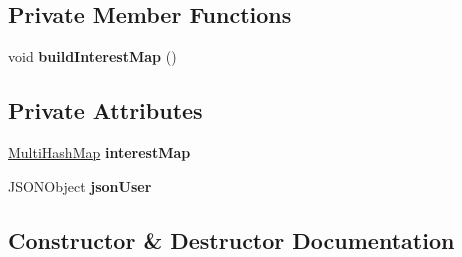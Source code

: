 \subsection*{Private Member Functions}
\begin{DoxyCompactItemize}
\item 
void {\bfseries build\+Interest\+Map} ()\hypertarget{classcom_1_1example_1_1sebastian_1_1tindertp_1_1commonTools_1_1ProfileInfo_a8d562369fc96d3a45db688558a87b998}{}\label{classcom_1_1example_1_1sebastian_1_1tindertp_1_1commonTools_1_1ProfileInfo_a8d562369fc96d3a45db688558a87b998}

\end{DoxyCompactItemize}
\subsection*{Private Attributes}
\begin{DoxyCompactItemize}
\item 
\hyperlink{classcom_1_1example_1_1sebastian_1_1tindertp_1_1commonTools_1_1MultiHashMap}{Multi\+Hash\+Map} {\bfseries interest\+Map}\hypertarget{classcom_1_1example_1_1sebastian_1_1tindertp_1_1commonTools_1_1ProfileInfo_abbc20b5242ba1b2957b09cf608342bd9}{}\label{classcom_1_1example_1_1sebastian_1_1tindertp_1_1commonTools_1_1ProfileInfo_abbc20b5242ba1b2957b09cf608342bd9}

\item 
J\+S\+O\+N\+Object {\bfseries json\+User}\hypertarget{classcom_1_1example_1_1sebastian_1_1tindertp_1_1commonTools_1_1ProfileInfo_aec90faa9e53b0ace65c0cbe0f6c97c67}{}\label{classcom_1_1example_1_1sebastian_1_1tindertp_1_1commonTools_1_1ProfileInfo_aec90faa9e53b0ace65c0cbe0f6c97c67}

\end{DoxyCompactItemize}


\subsection{Constructor \& Destructor Documentation}
